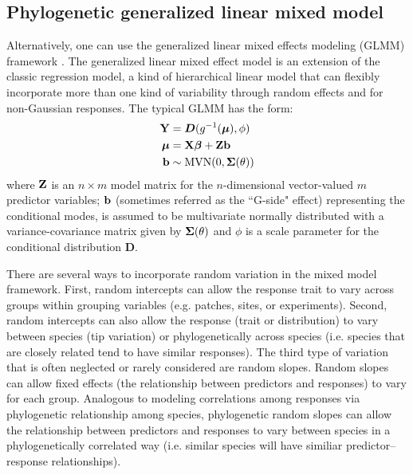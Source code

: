 \documentclass[12pt]{article}
\begin{document}
\subsection*{Phylogenetic generalized linear mixed model}
Alternatively, one can use the generalized linear mixed effects modeling (GLMM) framework \citep{lynch1991methods}.
The generalized linear mixed effect model is an extension of the classic regression model, a kind of hierarchical linear model that can flexibly incorporate more than one kind of variability through random effects and for non-Gaussian responses.
The typical GLMM has the form:
\begin{equation}
\begin{aligned}
{\mathbf Y} & = \bm{D}(g^{-1}({\boldsymbol \mu}), \phi) \\
{\boldsymbol \mu} & = {\mathbf X} {\boldsymbol \beta} + {\mathbf Z} {\mathbf b}  \\
{\mathbf b} & \sim \textrm{MVN}(0, {\boldsymbol \Sigma}(\theta))  \\
\label{eq:glmm}
\end{aligned}
\end{equation}
where ${\mathbf Z}$ is an $n \times m$ model matrix for the $n$-dimensional vector-valued $m$ predictor variables; ${\mathbf b}$ (sometimes referred as the ``G-side" effect) representing the conditional modes, is assumed to be multivariate normally distributed with a variance-covariance matrix given by ${\boldsymbol \Sigma}(\theta)$ and $\phi$ is a scale parameter for the conditional distribution $\bm{D}$.

There are several ways to incorporate random variation in the mixed model framework.
First, random intercepts can allow the response trait to vary across groups within grouping variables (e.g. patches, sites, or experiments). 
Second, random intercepts can also allow the response (trait or distribution) to vary between species (tip variation) or phylogenetically across species (i.e. species that are closely related tend to have similar responses).
The third type of variation that is often neglected or rarely considered are random slopes.
Random slopes can allow fixed effects (the relationship between predictors and responses) to vary for each group. 
Analogous to modeling correlations among responses via phylogenetic relationship among species, phylogenetic random slopes can allow the relationship between predictors and responses to vary between species in a phylogenetically correlated way (i.e. similar species will have similiar predictor--response relationships).
\end{document}
